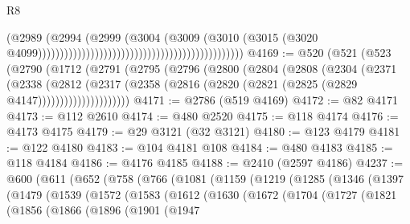 \begin{lexlean}{R8}
\begin{coremodule}
                                                                                  (@2989
                                                                                    (@2994
                                                                                      (@2999
                                                                                        (@3004
                                                                                          (@3009
                                                                                            (@3010
                                                                                              (@3015
                                                                                                (@3020
                                                                                                  @4099)))))))))))))))))))))))))))))))))))))))))))))))
@4169 := @520
    (@521
      (@523
        (@2790
          (@1712
            (@2791
              (@2795
                (@2796
                  (@2800
                    (@2804
                      (@2808
                        (@2304
                          (@2371
                            (@2338
                              (@2812
                                (@2317
                                  (@2358
                                    (@2816 (@2820 (@2821 (@2825 (@2829 @4147)))))))))))))))))))))
@4171 := @2786 (@519 @4169)
@4172 := @82 @4171
@4173 := @112 @2610
@4174 := @480 @2520
@4175 := @118 @4174
@4176 := @4173 @4175
@4179 := @29 @3121 (@32 @3121)
@4180 := @123 @4179
@4181 := @122 @4180
@4183 := @104 @4181 @108
@4184 := @480 @4183
@4185 := @118 @4184
@4186 := @4176 @4185
@4188 := @2410 (@2597 @4186)
@4237 := @600
    (@611
      (@652
        (@758
          (@766
            (@1081
              (@1159
                (@1219
                  (@1285
                    (@1346
                      (@1397
                        (@1479
                          (@1539
                            (@1572
                              (@1583
                                (@1612
                                  (@1630
                                    (@1672
                                      (@1704
                                        (@1727
                                          (@1821
                                            (@1856
                                              (@1866
                                                (@1896
                                                  (@1901
                                                    (@1947

\end{coremodule}
\end{lexlean}
